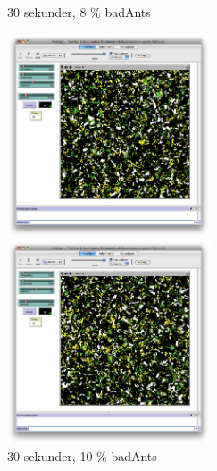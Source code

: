 \documentclass[titlepage, a4paper, 12pt]{article}
\begin{document}
\begin{figure}
  \begin{minipage}[b]{0.5\linewidth} %
    \centering
    \caption{30 sekunder, 8 \% badAnts}
    \includegraphics[width=6cm]{images/40-bad-30.png}
  \end{minipage}
  \hspace{0.5cm} %
  \begin{minipage}[b]{0.5\linewidth}
    \centering
    \caption{30 sekunder, 10 \% badAnts}
    \includegraphics[width=6cm]{images/50-bad-30.png}
  \end{minipage}


\end{figure}
\end{document}
